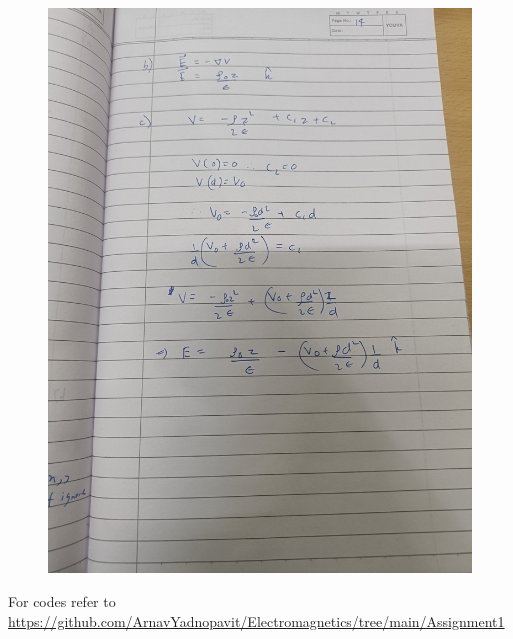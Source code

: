 \documentclass{article}
\begin{document}
\begin{figure}[H]
    \centering
    \includegraphics[width=\textwidth]{figs/written/14.jpg}
\end{figure}
For codes refer to \\
\url{https://github.com/ArnavYadnopavit/Electromagnetics/tree/main/Assignment1}
\end{document}
